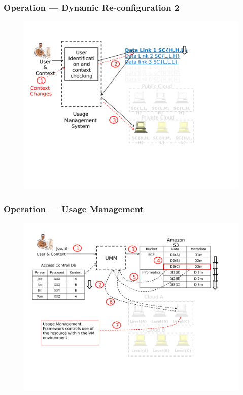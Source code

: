 \documentclass[t,handout]{beamer}
\begin{document}
\begin{frame}
\frametitle{Operation --- Dynamic Re-configuration 2}
\begin{figure}[!t]
\centering
\includegraphics[width=\textwidth]{5}
\end{figure}
\end{frame}

\begin{frame}
\frametitle{Operation --- Usage Management}
\begin{figure}[!t]
\centering
\includegraphics[width=\textwidth]{6}
\end{figure}
\end{frame}
\end{document}
